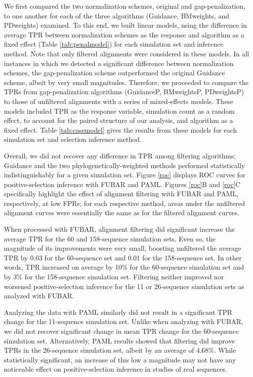 \documentclass[10pt]{article}
\begin{document}
We first compared the two normalization schemes, original and gap-penalization, to one another for each of the three algorithms (Guidance, BMweights, and PDweights) examined. To this end, we built linear models, using the difference in average TPR between normalization schemes as the response and algorithm as a fixed effect (Table \ref{tab:penalmodel}) for each simulation set and inference method. Note that only filtered alignments were considered in these models. In all instances in which we detected a significant difference between normalization schemes, the gap-penalization scheme outperformed the original Guidance scheme, albeit by very small magnitudes. Therefore, we proceeded to compare the TPRs from gap-penalization algorithms (GuidanceP, BMweightsP, PDweightsP) to those of unfiltered alignments with a series of mixed-effects models. These models included TPR as the response variable, simulation count as a random effect, to account for the paired structure of our analysis, and algorithm as a fixed effect. Table \ref{tab:casemodel} gives the results from these models for each simulation set and selection inference method.

Overall, we did not recover any difference in TPR among filtering algorithms; Guidance and the two phylogenetically-weighted methods performed statistically indistinguishably for a given simulation set. Figure \ref{roc} displays ROC curves for positive-selection inference with FUBAR and PAML. Figures \ref{roc}B and \ref{roc}C specifically highlight the effect of alignment filtering with FUBAR and PAML, respectively, at low FPRs; for each respective method, areas under the unfiltered alignment curves were essentially the same as for the filtered alignment curves.

When processed with FUBAR, alignment filtering did significant increase the average TPR for the 60 and 158-sequence simulation sets. Even so, the magnitude of its improvements were very small, boosting unfiltered the average TPR by 0.03 for the 60-sequence set and 0.01 for the 158-sequence set. In other words, TPR increased on average by 10\% for the 60-sequence simulation set and by 3\% for the 158-sequence simulation set. Filtering neither improved nor worsened positive-selection inference for the 11 or 26-sequence simulation sets as analyzed with FUBAR.

Analyzing the data with PAML similarly did not result in a significant TPR change for the 11-sequence simulation set. Unlike when analyzing with FUBAR, we did not recover significant change in mean TPR change for the 60-sequence simulation set. Alternatively, PAML results showed that filtering did improve TPRs in the 26-sequence simulation set, albeit by an average of 4.68\%. While statistically significant, an increase of this low a magnitude may not have any noticeable effect on positive-selection inference in studies of real sequences. 
\end{document}

